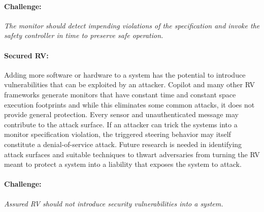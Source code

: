 \paragraph{Challenge:} \emph{The monitor should detect impending violations of
  the specification and invoke the safety controller in time to
  preserve safe operation.}


\paragraph{Secured RV:} Adding more software or hardware to a system
has the potential to introduce vulnerabilities that can be
exploited by an attacker.  Copilot and many other RV frameworks
generate monitors that have constant time and constant space execution
footprints and while this eliminates some common attacks, it does not
provide general protection. Every sensor and unauthenticated message
may contribute to the attack surface. If an attacker can trick the
systems into a monitor specification violation, the triggered steering
behavior may itself constitute a denial-of-service attack.  Future
research is needed in identifying attack surfaces and suitable
techniques to thwart adversaries from turning the RV meant to protect
a system into a liability that exposes the system to attack.

\paragraph{Challenge:} \emph{Assured RV should not introduce security
vulnerabilities into a system.} 



